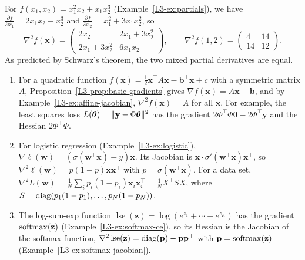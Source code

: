 \begin{example}\label{L3-ex:hessian}
    For $f(x_1, x_2) = x_1^2 x_2 + x_1 x_2^3$ (Example~\ref{L3-ex:partials}), we have $\frac{\partial f}{\partial x_1} = 2x_1x_2 + x_2^3$ and $\frac{\partial f}{\partial x_2} = x_1^2 + 3x_1x_2^2$, so
    \[\nabla^2 f(\mathbf{x}) = \begin{pmatrix} 2x_2 & 2x_1 + 3x_2^2 \\ 2x_1 + 3x_2^2 & 6x_1x_2 \end{pmatrix}, \qquad \nabla^2 f(1, 2) = \begin{pmatrix} 4 & 14 \\ 14 & 12 \end{pmatrix}.\]
    As predicted by Schwarz's theorem, the two mixed partial derivatives are equal.
\end{example}

\begin{example}\label{L3-ex:ml-hessians}
    \begin{enumerate}
        \item For a quadratic function $f(\mathbf{x}) = \frac{1}{2}\mathbf{x}^\top A\mathbf{x} - \mathbf{b}^\top\mathbf{x} + c$ with a symmetric matrix $A$, Proposition~\ref{L3-prop:basic-gradients} gives $\nabla f(\mathbf{x}) = A\mathbf{x} - \mathbf{b}$, and by Example~\ref{L3-ex:affine-jacobian}, $\nabla^2 f(\mathbf{x}) = A$ for all $\mathbf{x}$. For example, the least squares loss $L(\boldsymbol{\theta}) = \lVert \mathbf{y} - \Phi\boldsymbol{\theta} \rVert^2$ has the gradient $2\Phi^\top\Phi\boldsymbol{\theta} - 2\Phi^\top\mathbf{y}$ and the Hessian $2\Phi^\top\Phi$.
        \item For logistic regression (Example~\ref{L3-ex:logistic}), $\nabla \ell(\mathbf{w}) = (\sigma(\mathbf{w}^\top\mathbf{x}) - y)\mathbf{x}$. Its Jacobian is $\mathbf{x} \cdot \sigma'(\mathbf{w}^\top\mathbf{x})\mathbf{x}^\top$, so $\nabla^2 \ell(\mathbf{w}) = p(1 - p)\mathbf{x}\mathbf{x}^\top$ with $p = \sigma(\mathbf{w}^\top\mathbf{x})$. For a data set, $\nabla^2 L(\mathbf{w}) = \frac{1}{N}\sum_i p_i(1 - p_i)\mathbf{x}_i\mathbf{x}_i^\top = \frac{1}{N} X^\top S X$, where $S = \operatorname{diag}(p_1(1 - p_1), \ldots, p_N(1 - p_N))$.
        \item The log-sum-exp function $\operatorname{lse}(\mathbf{z}) = \log(e^{z_1} + \cdots + e^{z_K})$ has the gradient $\operatorname{softmax}(\mathbf{z})$ (Example~\ref{L3-ex:softmax-ce}), so its Hessian is the Jacobian of the softmax function, $\nabla^2 \operatorname{lse}(\mathbf{z}) = \operatorname{diag}(\mathbf{p}) - \mathbf{p}\mathbf{p}^\top$ with $\mathbf{p} = \operatorname{softmax}(\mathbf{z})$ (Example~\ref{L3-ex:softmax-jacobian}).
    \end{enumerate}
\end{example}

